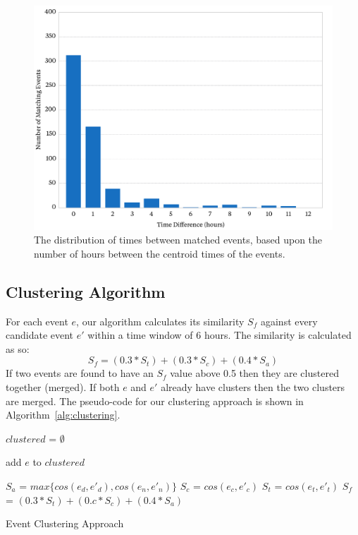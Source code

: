 \begin{figure}
	\includegraphics[width=\textwidth]{./Chapters/Collection/images/times}
	\caption{The distribution of times between matched events, based upon the number of hours between the centroid times of the events.}
	\label{fig:dif_diff}
\end{figure}

\subsection{Clustering Algorithm}
\label{sec:clusteringalg}
For each event \(e\), our algorithm calculates its similarity $S_f$ against every candidate event \(e'\) within a time window of 6 hours.
The similarity is calculated as so:
\begin{equation} \label{eq:simcluster}
S_{f} = (0.3 * S_{t}) + (0.3 * S_{c}) + (0.4 * S_{a})
\end{equation}
If two events are found to have an \(S_{f}\) value above 0.5 then they are clustered together (merged).
If both \(e\) and \(e'\) already have clusters then the two clusters are merged.
The pseudo-code for our clustering approach is shown in Algorithm~\ref{alg:clustering}.

\begin{algorithm}
$clustered$ = $\emptyset$\;
 {
	add $e$ to $clustered$\;
	 {

		$S_{a}$ = $max\{cos(e_d, e'_d), cos(e_n, e'_n)\}$\;
		$S_{c}$ = $cos(e_c, e'_c)$\;
		$S_{t}$ = $cos(e_t, e'_t)$\;
		$S_{f}$ = $(0.3 * S_{t}) + (0.c * S_{c}) + (0.4 * S_{a})$\;
		 {
			 
		}
	}
}
\caption{Event Clustering Approach}
\label{alg:clustering}
\end{algorithm}


